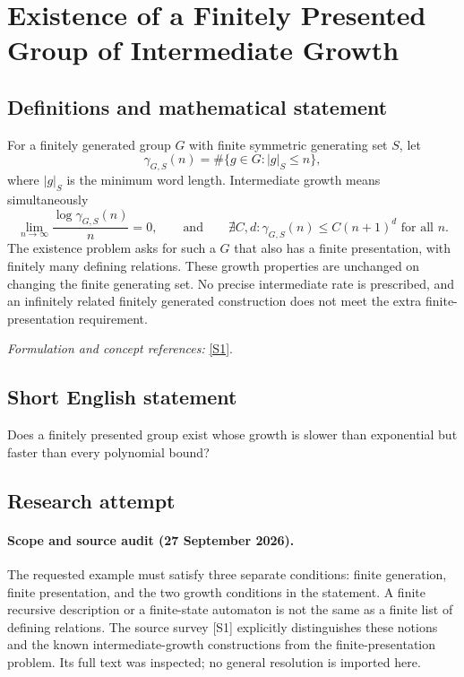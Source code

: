 \documentclass[11pt]{article}
\begin{document}
\section*{\texorpdfstring{Existence of a Finitely Presented Group of Intermediate Growth}{Existence of a Finitely Presented Group of Intermediate Growth}}\label{374}
\subsection{Definitions and mathematical statement}
For a finitely generated group $G$ with finite symmetric generating set $S$, let
\[
 \gamma_{G,S}(n)=\#\{g\in G:|g|_S\le n\},
\]
where $|g|_S$ is the minimum word length. Intermediate growth means simultaneously
\[
 \lim_{n\to\infty}\frac{\log\gamma_{G,S}(n)}n=0,
 \qquad\text{and}\qquad
 \nexists C,d:\gamma_{G,S}(n)\le C(n+1)^d\text{ for all }n.
\]
The existence problem asks for such a $G$ that also has a finite presentation, with finitely many defining relations. These growth properties are unchanged on changing the finite generating set. No precise intermediate rate is prescribed, and an infinitely related finitely generated construction does not meet the extra finite-presentation requirement.
\par\smallskip\textit{Formulation and concept references:} \href{https://ar5iv.labs.arxiv.org/html/1111.0512}{[S1]}.

\subsection{Short English statement}
Does a finitely presented group exist whose growth is slower than exponential but faster than every polynomial bound?
\subsection{Research attempt}
\paragraph{Scope and source audit (27 September 2026).}
The requested example must satisfy three separate conditions: finite
generation, finite presentation, and the two growth conditions in the
statement. A finite recursive description or a finite-state automaton
is not the same as a finite list of defining relations. The source
survey [S1] explicitly distinguishes these notions and the known
intermediate-growth constructions from the finite-presentation problem.
Its full text was inspected; no general resolution is imported here.
\end{document}
